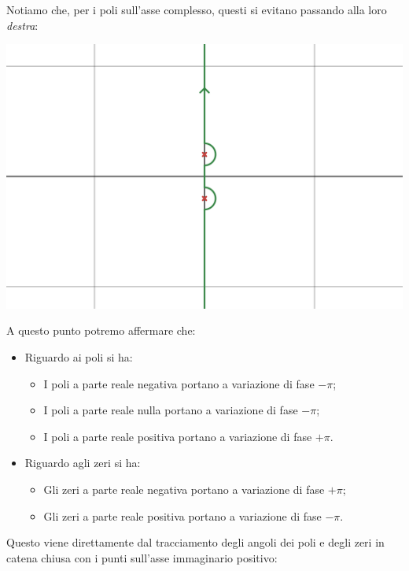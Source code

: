 \documentclass[a4paper,11pt]{article}
\begin{document}
\begin{enumerate}
\begin{minipage}{\textwidth}
		Notiamo che, per i poli sull'asse complesso, questi si evitano passando alla loro \textit{destra}:
		\begin{center}
			\includegraphics[scale=0.28]{../figures/nyq_crit_ip.png}
		\end{center}

		\end{minipage}

		A questo punto potremo affermare che:
		\begin{itemize}
			\item Riguardo ai poli si ha:
				\begin{itemize}
					\item I poli a parte reale negativa portano a variazione di fase $-\pi$;
					\item I poli a parte reale nulla portano a variazione di fase $-\pi$;
					\item I poli a parte reale positiva portano a variazione di fase $+\pi$.
				\end{itemize}
			\item Riguardo agli zeri si ha:
				\begin{itemize}
					\item Gli zeri a parte reale negativa portano a variazione di fase $+\pi$;
					\item Gli zeri a parte reale positiva portano a variazione di fase $-\pi$.
				\end{itemize}
		\end{itemize}

		Questo viene direttamente dal tracciamento degli angoli dei poli e degli zeri in catena chiusa con i punti sull'asse immaginario positivo:


\end{enumerate}
\end{document}
